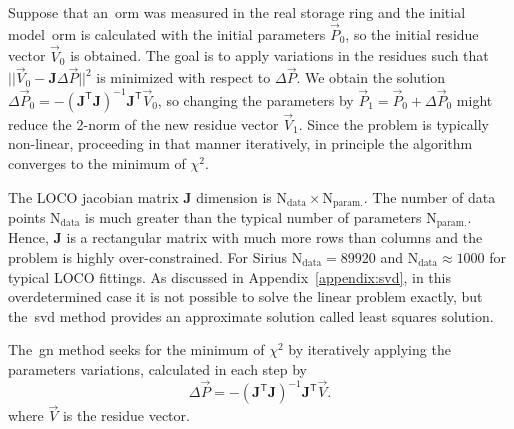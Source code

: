 Suppose that an~\gls{orm} was measured in the real storage ring and the initial model~\gls{orm} is calculated with the initial parameters $\vec{P}_0$, so the initial residue vector $\vec{V}_0$ is obtained. The goal is to apply variations in the residues such that $||\vec{V}_0 - \mathbf{J}\Delta\vec{P}||^2 $ is minimized with respect to $\Delta\vec{P}$. We obtain the solution $\Delta \vec{P}_0 = -\left(\mathbf{J}^{\mathsf{T}}\mathbf{J}\right)^{-1}\mathbf{J}^{\mathsf{T}}\vec{V}_0$, so changing the parameters by $\vec{P}_1 = \vec{P}_0 + \Delta \vec{P}_0$ might reduce the 2-norm of the new residue vector $\vec{V}_1$. Since the problem is typically non-linear, proceeding in that manner iteratively, in principle the algorithm converges to the minimum of $\chi^2$.

The LOCO jacobian matrix $\mathbf{J}$ dimension is $\mathrm{N}_{\mathrm{data}} \times \mathrm{N}_{\mathrm{param.}}$. The number of data points $\mathrm{N}_{\mathrm{data}}$ is much greater than the typical number of parameters $\mathrm{N}_{\mathrm{param.}}$. Hence, $\mathbf{J}$ is a rectangular matrix with much more rows than columns and the problem is highly over-constrained. For Sirius $\mathrm{N}_{\mathrm{data}} = 89920$ and $\mathrm{N}_{\mathrm{data}} \approx 1000$ for typical LOCO fittings. As discussed in Appendix~\ref{appendix:svd}, in this overdetermined case it is not possible to solve the linear problem exactly, but the~\gls{svd} method provides an approximate solution called least squares solution.

The~\gls{gn} method seeks for the minimum of $\chi^2$ by iteratively applying the parameters variations, calculated in each step by
\begin{equation}
    \Delta \vec{P} = - \left(\mathbf{J}^{\mathsf{T}} \mathbf{J}\right)^{-1}\mathbf{J}^{\mathsf{T}} \vec{V}.
\end{equation}
where $\vec{V}$ is the residue vector.


